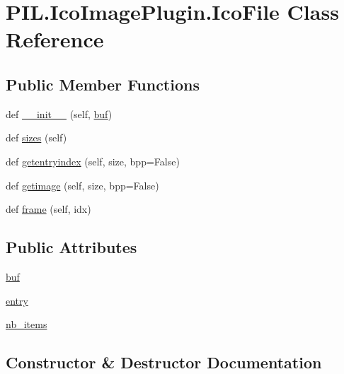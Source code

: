 \hypertarget{classPIL_1_1IcoImagePlugin_1_1IcoFile}{}\section{P\+I\+L.\+Ico\+Image\+Plugin.\+Ico\+File Class Reference}
\label{classPIL_1_1IcoImagePlugin_1_1IcoFile}
\subsection*{Public Member Functions}
\begin{DoxyCompactItemize}
\item 
def \hyperlink{classPIL_1_1IcoImagePlugin_1_1IcoFile_a606b0a6f540984cff83e85a81af02608}{\+\_\+\+\_\+init\+\_\+\+\_\+} (self, \hyperlink{classPIL_1_1IcoImagePlugin_1_1IcoFile_abefa6b6075319d1650e648e43e58cd00}{buf})
\item 
def \hyperlink{classPIL_1_1IcoImagePlugin_1_1IcoFile_a2feb67341ac419e69b52d5a10aa77c6a}{sizes} (self)
\item 
def \hyperlink{classPIL_1_1IcoImagePlugin_1_1IcoFile_a76accdd0e4245c2a2f706e0d480910fa}{getentryindex} (self, size, bpp=False)
\item 
def \hyperlink{classPIL_1_1IcoImagePlugin_1_1IcoFile_ac0fd5fb8457960edf55fb10f0f4cebab}{getimage} (self, size, bpp=False)
\item 
def \hyperlink{classPIL_1_1IcoImagePlugin_1_1IcoFile_a40ea25794e5c3b69a5bf8b3b1080ba43}{frame} (self, idx)
\end{DoxyCompactItemize}
\subsection*{Public Attributes}
\begin{DoxyCompactItemize}
\item 
\hyperlink{classPIL_1_1IcoImagePlugin_1_1IcoFile_abefa6b6075319d1650e648e43e58cd00}{buf}
\item 
\hyperlink{classPIL_1_1IcoImagePlugin_1_1IcoFile_a85536e2009ac9fafd47510f5dc8f1216}{entry}
\item 
\hyperlink{classPIL_1_1IcoImagePlugin_1_1IcoFile_a1d659c82b79b4a50955b54c8c0f93051}{nb\+\_\+items}
\end{DoxyCompactItemize}


\subsection{Constructor \& Destructor Documentation}
\mbox{\label{classPIL_1_1IcoImagePlugin_1_1IcoFile_a606b0a6f540984cff83e85a81af02608}} 
